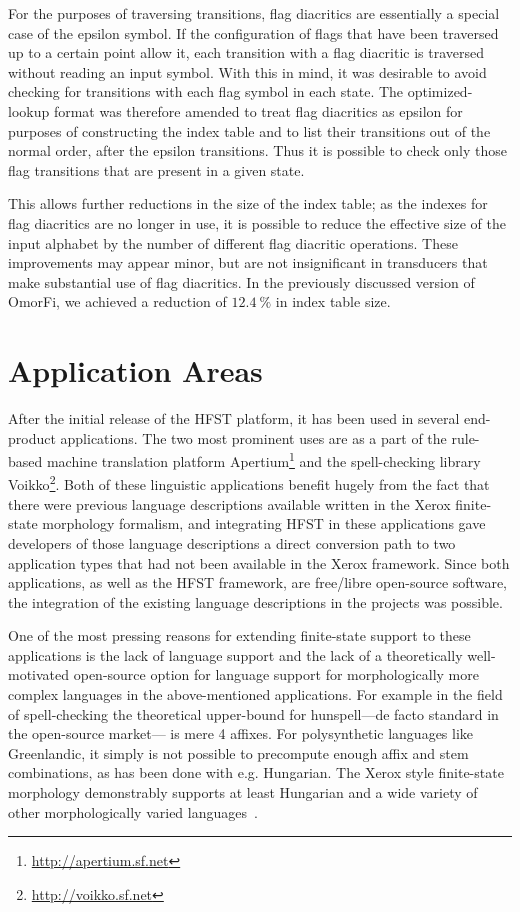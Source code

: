 \documentclass{llncs}
\begin{document}
For the purposes of traversing transitions, flag diacritics are essentially
a special case of the epsilon symbol. If the configuration of flags
that have been traversed up to a certain point allow it, each transition
with a flag diacritic is traversed without reading an input symbol. With
this in mind, it was desirable to avoid checking for transitions with each
flag symbol in each state. The optimized-lookup format was therefore amended
to treat flag diacritics as epsilon for purposes of constructing the index
table and to list their transitions out of the normal order, after the epsilon
transitions. Thus it is possible to check only those flag transitions that
are present in a given state.

This allows further reductions in the size of the index table; as
the indexes for flag diacritics are no longer in use, it is possible to reduce
the effective size of the input alphabet by the number of different flag
diacritic operations. These improvements may appear minor, but are not
insignificant in transducers that make substantial use of flag diacritics. In
the previously discussed version of OmorFi, we achieved a reduction of $12.4~\%$
in index table size.


\section{Application Areas}\label{hfst:application-areas}
After the initial release of the HFST platform, it has been used in several end-product
applications. The two most prominent uses are as a part of the rule-based
machine translation platform Apertium\footnote{\url{http://apertium.sf.net}}
and the spell-checking library Voikko\footnote{\url{http://voikko.sf.net}}. Both of
these linguistic applications benefit hugely from the fact that there
were previous language descriptions available written in the Xerox finite-state
morphology formalism, and integrating HFST in these applications gave
developers of those language descriptions a direct conversion path to two
application types that had not been available in the Xerox framework. Since
both applications, as well as the HFST framework, are free/libre open-source
software, the integration of the existing language descriptions in the
projects was possible.

One of the most pressing reasons for extending finite-state support to these
applications is the lack of language support and the lack of a theoretically well-motivated
open-source option for language support for morphologically more complex languages
in the above-mentioned applications. For example in the field of spell-checking the
theoretical upper-bound for hunspell---de facto standard in the open-source market---
is mere 4 affixes. For polysynthetic languages like Greenlandic, it simply is
not possible to precompute enough affix and stem combinations, as has been done with
e.g. Hungarian. The Xerox style finite-state morphology demonstrably supports
at least Hungarian and a wide variety of other morphologically varied
languages~\cite{beesley/2003}.
\end{document}
